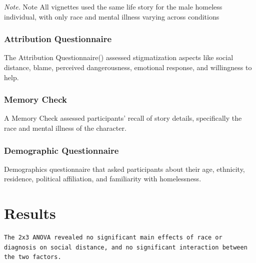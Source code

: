 \documentclass[
  man,
  floatsintext,
  longtable,
  nolmodern,
  notxfonts,
  notimes,
  colorlinks=true,linkcolor=blue,citecolor=blue,urlcolor=blue]{apa7}
\begin{document}
\begin{table}
{\vspace{-20pt}
\noindent \emph{Note.} Note All vignettes used the same life story for the male homeless individual, with only race and mental illness varying across conditions}

\end{table}

\subsubsection{Attribution
Questionnaire}\label{attribution-questionnaire}

The Attribution
Questionnaire() assessed stigmatization aspects like social
distance, blame, perceived dangerousness, emotional response, and
willingness to help.

\subsubsection{Memory Check}\label{memory-check}

A Memory Check assessed participants' recall of story details,
specifically the race and mental illness of the character.

\subsubsection{Demographic
Questionnaire}\label{demographic-questionnaire}

Demographics questionnaire that asked participants about their age,
ethnicity, residence, political affiliation, and familiarity with
homelessness.

\section{Results}\label{results}

\begin{verbatim}
The 2x3 ANOVA revealed no significant main effects of race or diagnosis on social distance, and no significant interaction between the two factors.
\end{verbatim}
\end{document}
